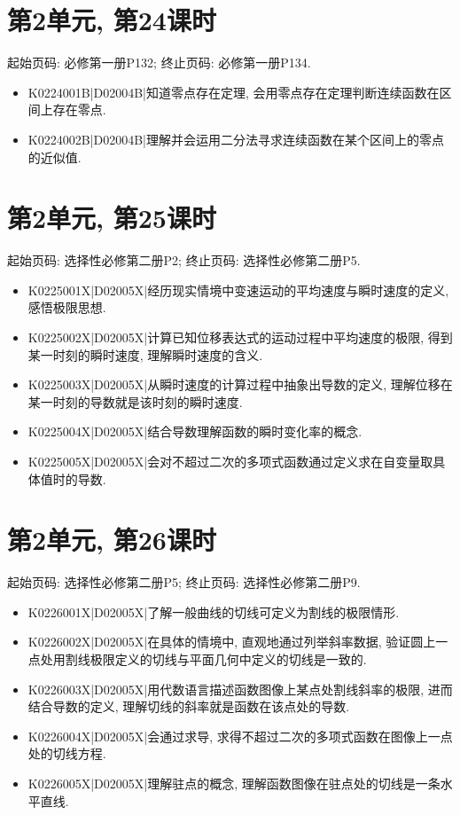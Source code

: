 \section*{第2单元, 第24课时}
起始页码: 必修第一册P132; 终止页码: 必修第一册P134.
\begin{itemize}
\item K0224001B|D02004B|知道零点存在定理, 会用零点存在定理判断连续函数在区间上存在零点.
\item K0224002B|D02004B|理解并会运用二分法寻求连续函数在某个区间上的零点的近似值.
\end{itemize}

\section*{第2单元, 第25课时}
起始页码: 选择性必修第二册P2; 终止页码: 选择性必修第二册P5.
\begin{itemize}
\item K0225001X|D02005X|经历现实情境中变速运动的平均速度与瞬时速度的定义, 感悟极限思想.
\item K0225002X|D02005X|计算已知位移表达式的运动过程中平均速度的极限, 得到某一时刻的瞬时速度, 理解瞬时速度的含义.
\item K0225003X|D02005X|从瞬时速度的计算过程中抽象出导数的定义, 理解位移在某一时刻的导数就是该时刻的瞬时速度.
\item K0225004X|D02005X|结合导数理解函数的瞬时变化率的概念.
\item K0225005X|D02005X|会对不超过二次的多项式函数通过定义求在自变量取具体值时的导数.
\end{itemize}

\section*{第2单元, 第26课时}
起始页码: 选择性必修第二册P5; 终止页码: 选择性必修第二册P9.
\begin{itemize}
\item K0226001X|D02005X|了解一般曲线的切线可定义为割线的极限情形.
\item K0226002X|D02005X|在具体的情境中, 直观地通过列举斜率数据, 验证圆上一点处用割线极限定义的切线与平面几何中定义的切线是一致的.
\item K0226003X|D02005X|用代数语言描述函数图像上某点处割线斜率的极限, 进而结合导数的定义, 理解切线的斜率就是函数在该点处的导数.
\item K0226004X|D02005X|会通过求导, 求得不超过二次的多项式函数在图像上一点处的切线方程.
\item K0226005X|D02005X|理解驻点的概念, 理解函数图像在驻点处的切线是一条水平直线.
\end{itemize}

